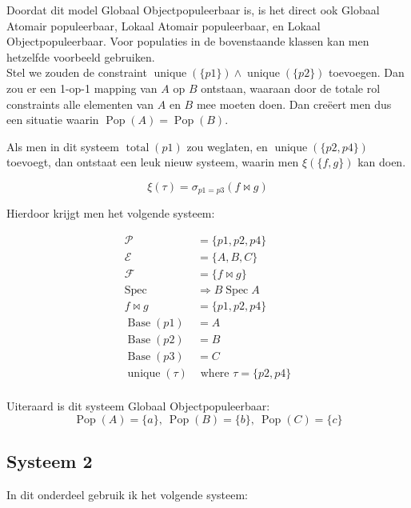 \documentclass[11pt]{article}
\newcommand{\Spec}{\ensuremath{\operatorname{Spec}}}
\newcommand{\Base}{\ensuremath{\operatorname{Base}}}
\newcommand{\total}{\ensuremath{\operatorname{total}}}
\newcommand{\unique}{\ensuremath{\operatorname{unique}}}
\newcommand{\Pop}{\ensuremath{\operatorname{Pop}}}
\begin{document}
Doordat dit model Globaal Objectpopuleerbaar is, is het direct ook Globaal
Atomair populeerbaar, Lokaal Atomair populeerbaar, en Lokaal
Objectpopuleerbaar. Voor populaties in de bovenstaande klassen kan men
hetzelfde voorbeeld gebruiken.\\


Stel we zouden de constraint $\operatorname{unique}(\{p1\}) \wedge
\operatorname{unique}(\{p2\})$ toevoegen. Dan zou er een 1-op-1 mapping van $A$
op $B$ ontstaan, waaraan door de totale rol constraints alle elementen van $A$
en $B$ mee moeten doen. Dan creëert men dus een situatie waarin
$\operatorname{Pop}(A)=\operatorname{Pop}(B)$.

Als men in dit systeem $\total (p1)$ zou weglaten, en $\operatorname{unique}
(\{p2,p4\})$ toevoegt, dan ontstaat een leuk nieuw systeem, waarin men $\xi
(\{f,g\})$ kan doen. 

\[
  \xi (\tau) = \sigma_{p1=p3} (f \bowtie g)
\]

Hierdoor krijgt men het volgende systeem:

\begin{align*}
  \mathcal{P} & = \{p1,p2,p4\}    \\
  \mathcal{E} & = \{A,B,C\}       \\
  \mathcal{F} & =  \{f\bowtie g\} \\
  \Spec &\Rightarrow B \Spec A    \\
  f \bowtie g & = \{p1,p2,p4\}    \\
  \Base (p1)  & = A               \\
  \Base (p2)  & = B               \\
  \Base (p3)  & = C               \\
  \unique (\tau) &\text{ where } \tau = \{p2,p4\} \\
\end{align*}

Uiteraard is dit systeem Globaal Objectpopuleerbaar: 
\[ \Pop (A) = \{a\},\  \Pop (B) = \{b\},\  \Pop (C)= \{c\} \]

\subsection{Systeem 2}

In dit onderdeel gebruik ik het volgende systeem: 
\end{document}
